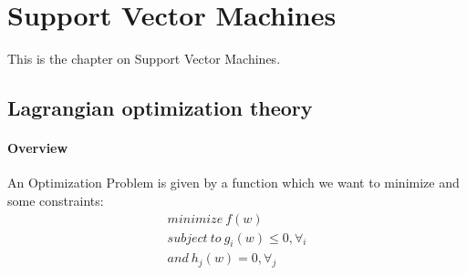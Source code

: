 \documentclass[main]{subfiles}
\begin{document}

\section{Support Vector Machines}
This is the chapter on Support Vector Machines.
\subsection{Lagrangian optimization theory}
\paragraph{Overview}
An Optimization Problem is given by a function which we want to minimize and some constraints:
\begin{align}
minimize \ f(w) \\
subject \ to \ g_i(w) \leq 0, \forall_i \\
and \ h_j(w) = 0, \forall_j
\end{align}
\end{document}
